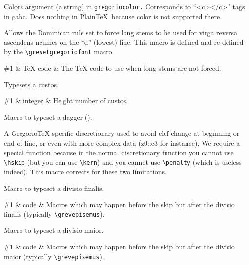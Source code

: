 Colors argument (a string) in \verb=gregoriocolor.=  Corresponds to ``<c></c>'' tags in gabc.  Does nothing in Plain\TeX\ because color is not supported there.

Allows the Dominican rule set to force long stems to be used for virga
reversa ascendens neumes on the ``d'' (lowest) line.  This macro is
defined and re-defined by the \verb=\gresetgregoriofont= macro.

\begin{argtable}
  \#1 & \TeX{} code & The \TeX{} code to use when long stems are not forced.\\
\end{argtable}

Typesets a custos.

\begin{argtable}
  \#1 & integer & Height number of custos.\\
\end{argtable}

Macro to typeset a dagger (\GreDagger).

A GregorioTeX specific discretionary used to avoid clef change at beginning or end of line, or even with more complex data (z0::c3 for instance).  We require a special function because in the normal discretionary function you cannot use \verb=\hskip= (but you can use \verb=\kern=) and you cannot use \verb=\penalty= (which is useless indeed).  This macro corrects for these two limitations.

Macro to typeset a divisio finalis.

\begin{argtable}
  \#1 & code & Macros which may happen before the skip but after the divisio finalis (typically \verb=\grevepisemus=).\\
\end{argtable}

Macro to typeset a divisio maior.

\begin{argtable}
  \#1 & code & Macros which may happen before the skip but after the divisio maior (typically \verb=\grevepisemus=).\\
\end{argtable}

